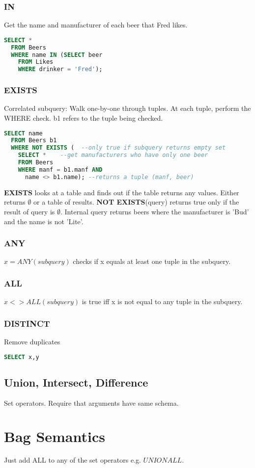 \documentclass[12pt]{article}
\begin{document}
\subsubsection{IN}
Get the name and manufacturer of each beer that Fred likes.
\begin{lstlisting}[language=SQL]
  SELECT *
  FROM Beers
  WHERE name IN (SELECT beer
    FROM Likes
    WHERE drinker = 'Fred');
\end{lstlisting}

\subsubsection{EXISTS}

Correlated subquery: 
Walk one-by-one through tuples.
At each tuple, perform the WHERE check.
b1 refers to the tuple being checked.
\begin{lstlisting}[language=SQL]
  SELECT name
  FROM Beers b1
  WHERE NOT EXISTS (  --only true if subquery returns empty set
    SELECT *    --get manufacturers who have only one beer
    FROM Beers
    WHERE manf = b1.manf AND
      name <> b1.name); --returns a tuple (manf, beer)
\end{lstlisting}

\textbf{EXISTS} looks at a table and finds out if the table returns any values.
Either returns $\emptyset$ or a table of results. \textbf{NOT EXISTS}(query)
returns true only if the result of query is $\emptyset$.
Internal query returns beers where the manufacturer is 'Bud' and the name is not
'Lite'.

\subsubsection{ANY}
$x = ANY (subquery)$ checks if  x equals at least one tuple in the subquery.
\subsubsection{ALL}
$x <> ALL(subquery)$ is true iff x is not equal to any tuple in the subquery.

\subsubsection{DISTINCT}
Remove duplicates

\begin{lstlisting}[language=SQL]
  SELECT x,y
\end{lstlisting}

\subsection{Union, Intersect, Difference}
Set operators. Require that arguments have same schema. 

\section{Bag Semantics}
Just add ALL to any of the set operators e.g. $UNION ALL$.
\end{document}
